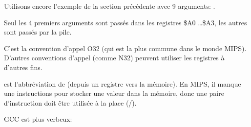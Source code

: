 Utilisons encore l'exemple de la section précédente avec 9 arguments: .




Seul les 4 premiers arguments sont passés dans les registres \$A0 \dots \$A3,
les autres sont passés par la pile.

C'est la convention d'appel O32 (qui est la plus commune dans le monde MIPS).
D'autres conventions d'appel (comme N32) peuvent utiliser les registres à d'autres fins.


 est l'abbréviation de  (depuis un registre vers la mémoire).
En MIPS, il manque une instructions pour stocker une valeur dans la mémoire, donc
une paire d'instruction doit être utilisée à la place (/).






GCC \NonOptimizing est plus verbeux:





